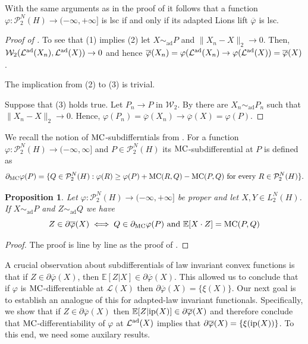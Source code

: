 \documentclass[a4paper]{amsart}
\numberwithin{theorem}{section}
\newtheorem{proposition}[theorem]{Proposition}
\theoremstyle{definition}
\newcommand{\E}{\mathbb{E}}
\newcommand{\law}{\mathcal{L}}
\newcommand{\W}{\mathcal{W}}
\newcommand{\Pc}{\mathcal P}
\newcommand{\simad}{\sim_{\mathrm{ad}}}
\renewcommand{\H}{H}
\renewcommand{\phi}{\varphi}
\newcommand{\mc}{\textup{MC}}
\newcommand{\ip}{\textup{ip}}
\newcommand{\lawad}{\law^{\textup{ad}}}
\begin{document}
With the same arguments as in the proof of  it follows that a function $\phi : \Pc_2^N(\H) \to (-\infty, +\infty]$ is lsc if and only if its adapted Lions lift $\overline{\phi}$ is lsc.
\begin{proof}[Proof of ]
To see that (1) implies (2) let $X \simad P$ and $\|X_n - X \|_2 \to 0$. Then, $\W_2(\lawad(X_n), \lawad(X)) \to 0$ and hence $\overline{\phi}(X_n) = \phi(\lawad(X_n) \to \phi(\lawad(X)) = \overline{\phi}(X)$. 

The implication from (2) to (3) is trivial.

Suppose that (3) holds true. Let $P_n \to P$ in $\W_2$. By  there are $X_n \simad P_n$ such that $\| X_n - X\|_2 \to 0$. Hence, $\phi(P_n) = \overline{\phi}(X_n) \to \overline{\phi}(X) = \phi(P)$. 
\end{proof}


\medskip

We recall the notion of $\mc$-subdifferntials from . For a function  $\phi : \Pc_2^N(\H) \to (-\infty, \infty]$ and $P \in \Pc_2^N(\H)$ its $\mc$-subdifferential at $P$ is defined as 
\[
\partial_{\mc} \phi(P) = \{ Q\in \Pc_2^N(\H) : \phi(R) \ge \phi(P) + \mc(R,Q) - \mc(P,Q) \text{ for every } R \in \Pc_2^N(\H)\}.
\]

\begin{proposition}\label{prop:subdiff_char_ad}
Let $\phi : \Pc_2^N(\H) \to (-\infty, +\infty]$ be proper and let $X,Y \in L_2^N(\H)$. If $X \simad P$ and $Z \simad Q$ we have
\[
Z \in \partial \overline{\phi}(X) \iff Q \in \partial_{\mc} \phi(P) \text{ and } \E[X \cdot Z] = \mc(P,Q) 
\]
\end{proposition}
\begin{proof}
The proof is line by line as the proof of .    
\end{proof}


A crucial observation about subdifferentials of law invariant convex functions is that if $Z \in \partial\overline{\phi}(X)$, then $\E[Z | X ] \in \partial\overline{\phi}(X)$. This allowed us to conclude that if $\phi$ is $\mc$-differentiable at $\law(X)$ then $\partial\overline{\phi}(X) = \{ \xi(X) \}$. Our next goal is to establish an analogue of this for adapted-law invariant functionals. Specifically, we show that if $Z \in \partial\overline{\phi}(X)$ then $\E[Z | \ip(X) ] \in \partial\overline{\phi}(X)$ and therefore conclude that $\mc$-differentiability of $\phi$ at $\lawad(X)$ implies that $\partial\overline{\phi}(X) = \{ \xi(\ip(X)) \}$. To this end, we need some auxilary results. 
\end{document}
